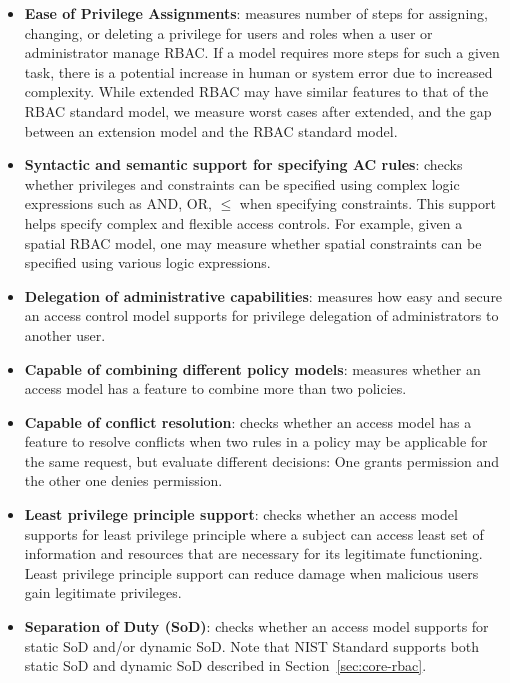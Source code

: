 \begin{itemize}
	\item \textbf{Ease of Privilege Assignments}: measures number of steps for assigning, changing, or deleting a privilege for users and roles when a user or administrator manage RBAC. If a model requires more steps for such a given task, there is a potential increase in human or system error due to increased complexity. While extended RBAC may have similar features to that of the RBAC standard model, we measure worst cases after extended, and the gap between an extension model and the RBAC standard model.
	
	\item \textbf{Syntactic and semantic support for specifying AC rules}: checks whether privileges and constraints can be specified using complex logic expressions such as AND, OR, $\leq$ when specifying constraints. This support helps specify complex and flexible access controls. For example, given a spatial RBAC model, one may measure whether spatial constraints can be specified using various logic expressions.

	\item \textbf{Delegation of administrative capabilities}: measures how easy and secure an access control model supports for privilege delegation of administrators to another user.

	\item \textbf{Capable of combining different policy models}: measures whether an access model has a feature to combine more than two policies.

	\item \textbf{Capable of conflict resolution}: checks whether an access model has a feature to resolve conflicts when two rules in a policy may be applicable for the same request, but evaluate different decisions: One grants permission and the other one denies permission.

	\item \textbf{Least privilege principle support}: checks whether an access model supports for least privilege principle where a subject can access least set of information and resources that are necessary for its legitimate functioning. Least privilege principle support can reduce damage when malicious users gain legitimate privileges.

	\item \textbf{Separation of Duty (SoD)}: checks whether an access model supports for static SoD and/or dynamic SoD. Note that NIST Standard supports both static SoD and dynamic SoD described in Section~\ref{sec:core-rbac}.
\end{itemize}

